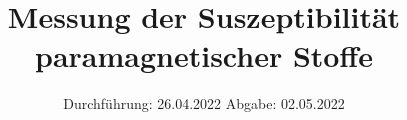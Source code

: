 

\subject{v606}
\title{Messung der Suszeptibilität paramagnetischer Stoffe}
\date{%
  Durchführung: 26.04.2022
  \hspace{3em}
  Abgabe: 02.05.2022
}



\maketitle
\thispagestyle{empty}
\tableofcontents
\newpage






\printbibliography{}




